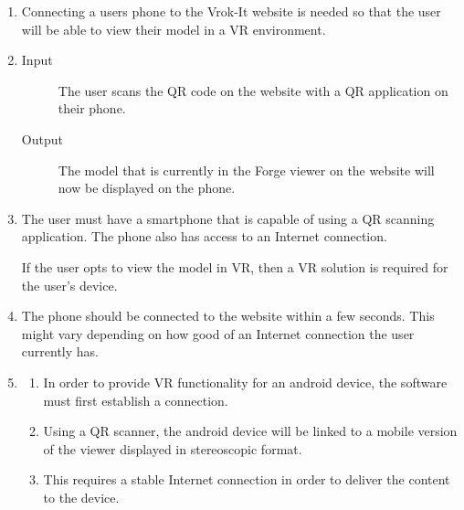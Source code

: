 \documentclass[letterpaper, 10pt, draftclsnofoot, compsoc, onecolumn]{IEEEtran}
\begin{document}
\begin{enumerate}

	\item Connecting a users phone to the Vrok-It website is needed so that the user will be able to view their model in a VR environment. 

	\item
	\begin{description}
		\item[Input] The user scans the QR code on the website with a QR application on their phone. 
		\item[Output] The model that is currently in the Forge viewer on the website will now be displayed on the phone. 
	\end{description}

	\item The user must have a smartphone that is capable of using a QR scanning application. The phone also has access to an Internet 
	connection. 
	
	If the user opts to view the model in VR, then a VR solution is required for the user's device.

	\item The phone should be connected to the website within a few seconds. This might vary depending on how good of an Internet 
	connection the user currently has. 

	\item
	\begin{enumerate}
		\item In order to provide VR functionality for an android device, the software must first establish a connection. 
		\item Using a QR scanner, the android device will be linked to a mobile version of the viewer displayed in stereoscopic format. 
		\item This requires a stable Internet connection in order to deliver the content to the device.
	\end{enumerate}
\end{enumerate}
\end{document}

